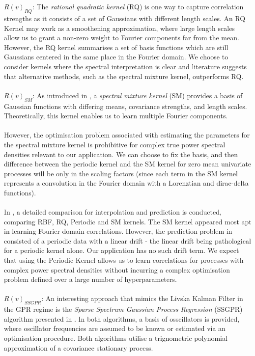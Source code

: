 \\
\\
\textbf{$R(v)_{RQ}$}: The \textit{rational quadratic kernel} (RQ) is one way to capture correlation strengths as it consists of a set of Gaussians with different length scales. An RQ Kernel may work as a smoothening approximation, where large length scales allow us to grant a non-zero weight to Fourier components far from the mean. However, the RQ kernel summarises a set of basis functions which are still Gaussians centered in the same place in the Fourier domain. We choose to consider kernels where the spectral interpretation is clear and literature suggests that alternative methods, such as the spectral mixture kernel, outperforms RQ.  
\\
\\
\textbf{$R(v)_{SM}$}: As introduced in \cite{wilson2013gaussian}, a \textit{spectral mixture kernel} (SM) provides a basis of Gaussian functions with differing means, covariance strengths, and length scales. Theoretically, this kernel enables us to learn multiple Fourier components. 
\\
\\
However, the optimisation problem associated with estimating the parameters for the spectral mixture kernel is prohibitive for complex true power spectral densities relevant to our application. We can choose to fix the basis, and then difference between the periodic kernel and the SM kernel for zero mean univariate processes will be only in the scaling factors (since each term in the SM kernel represents a convolution in the Fourier domain with a Lorenztian and dirac-delta functions). 
\\
\\
In \cite{wilson2013gaussian}, a detailed comparison for interpolation and prediction is conducted, comparing RBF, RQ, Periodic and SM kernels. The SM kernel appeared most apt in learning Fourier domain correlations. However, the prediction problem in \cite{wilson2013gaussian} consisted of a periodic data with a linear drift - the linear drift being pathological for a periodic kernel alone. Our application has no such drift term. We expect that using the Periodic Kernel allows us to learn correlations for processes with complex power spectral densities without incurring a complex optimisation problem defined over a large number of hyperparameters. 
\\
\\
\textbf{$R(v)_{SSGPR}$}: An interesting approach that mimics the Livska Kalman Filter in the GPR regime is the \textit{Sparse Spectrum Gaussian Process Regression} (SSGPR) algorithm presented in \cite{quia2010sparse}. In both algorithms, a basis of osscillators is provided, where oscillator frequencies are assumed to be known or estimated via an optimisation procedure. Both algorithms utilise a trignometric polynomial approximation of a covariance stationary process. 
